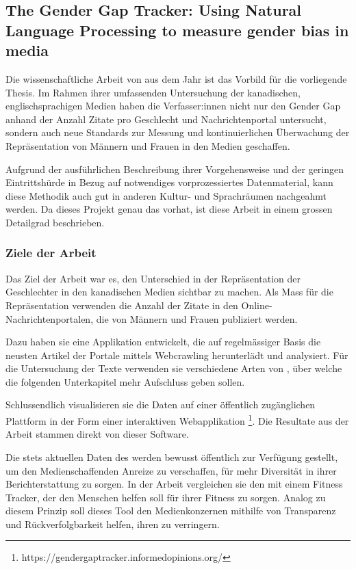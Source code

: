 \subsection{The Gender Gap Tracker: Using Natural Language Processing to measure gender bias in media}

Die wissenschaftliche Arbeit  \cite{gender_gap_tracker} von \citeauthor{gender_gap_tracker}
aus dem Jahr \citeyear{gender_gap_tracker} ist das Vorbild für die vorliegende Thesis. Im Rahmen
ihrer umfassenden Untersuchung der kanadischen, englischsprachigen Medien haben die Verfasser:innen nicht nur
den Gender Gap anhand der Anzahl Zitate pro Geschlecht und Nachrichtenportal untersucht, sondern 
auch neue Standards zur Messung und kontinuierlichen Überwachung der Repräsentation von Männern und Frauen in den
Medien geschaffen.

Aufgrund der ausführlichen Beschreibung ihrer Vorgehensweise und der geringen Eintrittshürde in
Bezug auf notwendiges vorprozessiertes Datenmaterial, kann diese Methodik auch gut in anderen Kultur-
und Sprachräumen nachgeahmt werden. Da dieses Projekt genau das vorhat, ist diese Arbeit in einem
grossen Detailgrad beschrieben.

\subsubsection{Ziele der Arbeit}

Das Ziel der Arbeit war es, den Unterschied in der Repräsentation der Geschlechter in den kanadischen
Medien sichtbar zu machen. Als Mass für die Repräsentation verwenden \citeauthor{gender_gap_tracker}
die Anzahl der Zitate in den Online-Nachrichtenportalen, die von Männern und Frauen publiziert werden.

Dazu haben sie eine Applikation entwickelt, die auf regelmässiger Basis die neusten Artikel
der Portale mittels Webcrawling herunterlädt und analysiert. Für die Untersuchung der Texte verwenden sie
verschiedene Arten von , über welche die folgenden Unterkapitel mehr Aufschluss geben sollen.

Schlussendlich visualisieren sie die Daten auf einer öffentlich zugänglichen Plattform in der Form einer
interaktiven Webapplikation
\footnote{https://gendergaptracker.informedopinions.org/}.
Die Resultate aus der Arbeit stammen direkt von dieser Software.

Die stets aktuellen Daten des  werden bewusst öffentlich zur Verfügung gestellt, um den Medienschaffenden
Anreize zu verschaffen, für mehr Diversität in ihrer Berichterstattung zu sorgen. In der Arbeit
vergleichen sie den  mit einem Fitness Tracker, der den Menschen helfen soll für ihrer
Fitness zu sorgen. Analog zu diesem Prinzip soll dieses Tool den Medienkonzernen mithilfe von Transparenz
und Rückverfolgbarkeit helfen, ihren  zu verringern.

